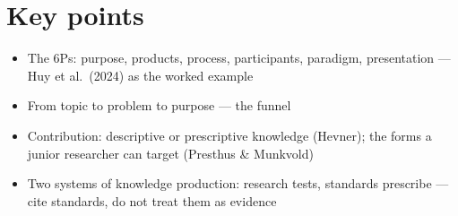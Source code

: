 \documentclass[11pt,a4paper,british,twoside=false,headings=small,chapterprefix=false,numbers=noenddot]{scrbook}
\begin{document}
\section*{Key points}
\begin{itemize}
  \item The 6Ps: purpose, products, process, participants, paradigm, presentation --- Huy et al.\ (2024) as the worked example
  \item From topic to problem to purpose --- the funnel
  \item Contribution: descriptive or prescriptive knowledge (Hevner); the forms a junior researcher can target (Presthus \& Munkvold)
  \item Two systems of knowledge production: research tests, standards prescribe --- cite standards, do not treat them as evidence
\end{itemize}
\end{document}
